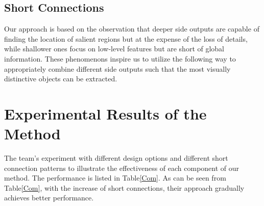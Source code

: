 \documentclass[10pt,twocolumn,letterpaper]{article}
\begin{document}
\subsection{Short Connections}

Our approach is based on the observation that deeper side outputs are capable of finding the location of salient regions but at the expense of the loss of details, while shallower ones focus on low-level features but are short of global information. These phenomenons inspire us to utilize the following way to appropriately combine different side outputs such that the most visually distinctive objects can be extracted.

\section{Experimental Results of the Method}

The team's experiment with different design options and different short connection patterns to illustrate the effectiveness of each component of our method. The performance is listed in Table\ref{Com}. As can be seen from Table\ref{Com}, with the increase of short connections, their approach gradually achieves better performance.



{\small


}
\end{document}
